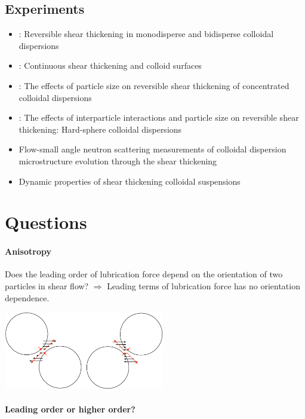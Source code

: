 \documentclass[12pt]{article}
\begin{document}
\subsection*{Experiments}

\begin{itemize}
 \item \citet{Bender_1996}:
Reversible shear thickening in monodisperse and bidisperse colloidal dispersions
 \item \citet{Melrose_1996}:
Continuous shear thickening and colloid surfaces
 \item \citet{Maranzano_2001}:
The effects of particle size on reversible shear thickening of concentrated colloidal dispersions
 \item \citet{Maranzano_2001a}:
The effects of interparticle interactions and particle size 
on reversible shear thickening: Hard-sphere colloidal dispersions
 \item \citet{Maranzano_2002}
Flow-small angle neutron scattering measurements 
of colloidal dispersion microstructure evolution through the shear thickening 
 \item \cite{Lee_2003}
Dynamic properties of shear thickening colloidal suspensions

 \end{itemize}

\section{Questions}

\paragraph{Anisotropy}
Does the leading order of lubrication force depend 
on the orientation of two particles in shear flow?
%
$\Longrightarrow$ 
Leading terms of lubrication force
has no orientation dependence.
%
\begin{center}
\includegraphics[width=7cm]{Lub_orientation_dependence.pdf} 
\end{center}

\paragraph{Leading order or higher order?}
\end{document}
